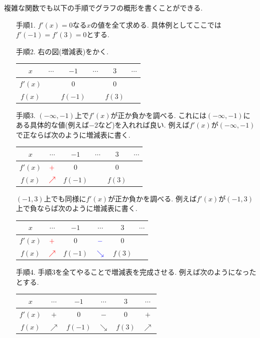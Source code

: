 \documentclass[dvipdfmx,a4paper,11pt]{article}
\theoremstyle{definition}
\newcommand{\xb}[1]{\textcolor{blue}{#1}}
\newcommand{\xr}[1]{\textcolor{red}{#1}}
\begin{document}
複雑な関数でも以下の手順でグラフの概形を書くことができる.


\begin{tcolorbox}[
    colback = white,
    colframe = green!35!black,
    fonttitle = \bfseries,
    breakable = true]
\begin{itemize}
\item[手順1.]  $f'(x)=0$なる$x$の値を全て求める.  具体例としてここでは$f'(-1)=f'(3)=0$とする.
\item[手順2.]  右の図(増減表)をかく.
\begin{tabular}{|c||ccccc|}
\hline
$x$ & $\cdots$ & $-1$ & $\cdots$ & $3$ & $\cdots$ \\
\hline
$f'(x)$ &  & $0$ &  & $0$ &  \\
\hline
$f(x)$  &  & $f(-1)$ &  & $f(3)$&  \\
\hline
\end{tabular}
\item[手順3.] $(-\infty, -1)$上で$f'(x)$が正か負かを調べる. これには$(-\infty, -1)$にある具体的な値(例えば$-2$など)を入れれば良い.
例えば$f'(x)$が$(-\infty, -1)$で正ならば次のように増減表に書く.
\begin{center}
\begin{tabular}{|c||ccccc|}
\hline
$x$ & $\cdots$ & $-1$ & $\cdots$ & $3$ & $\cdots$ \\
\hline
$f'(x)$ &  $\xr{+}$& $0$ &  & $0$ &  \\
\hline
$f(x)$  & $\xr{\nearrow}$  & $f(-1)$ &  & $f(3)$&  \\
\hline
\end{tabular}
\end{center}
$(-1, 3)$上でも同様に$f'(x)$が正か負かを調べる. 例えば$f'(x)$が$(-1, 3)$上で負ならば次のように増減表に書く.
\begin{center}
\begin{tabular}{|c||ccccc|}
\hline
$x$ & $\cdots$ & $-1$ & $\cdots$ & $3$ & $\cdots$ \\
\hline
$f'(x)$ &  $\xr{+}$& $0$ & $\xb{-}$ & $0$ &  \\
\hline
$f(x)$  & $\xr{\nearrow}$  & $f(-1)$ & \xb{ $\searrow$} & $f(3)$&  \\
\hline
\end{tabular}
\end{center}

\item[手順4.] 手順3を全てやることで増減表を完成させる. 例えば次のようになったとする. 
\begin{center}
\begin{tabular}{|c||ccccc|}
\hline
$x$ & $\cdots$ & $-1$ & $\cdots$ & $3$ & $\cdots$ \\
\hline
$f'(x)$ & $+$ & $0$ & $-$ & $0$ & $+$ \\
\hline
$f(x)$ & $\nearrow$ &  $f(-1)$ & $\searrow$ &$f(3)$ & $\nearrow$ \\
\hline
\end{tabular}
\end{center}


\end{itemize}
\end{tcolorbox}
\end{document}
